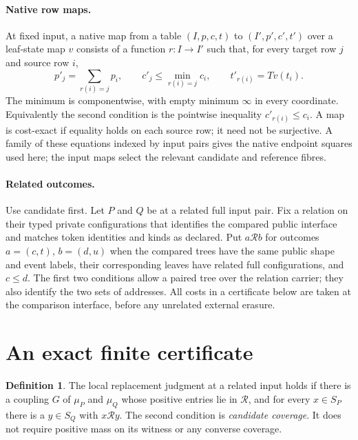 \documentclass[11pt]{article}
\theoremstyle{definition}
\newtheorem{definition}[theorem]{Definition}
\newcommand{\R}{\mathcal R}
\begin{document}
\paragraph{Native row maps.}
At fixed input, a native map from a table $(I,p,c,t)$ to
$(I',p',c',t')$ over a leaf-state map $v$ consists of a function $r:I\to I'$
such that, for every target row $j$ and source row $i$,
\[
 p'_j=\sum_{r(i)=j}p_i,\qquad
 c'_j\leq\min_{r(i)=j}c_i,\qquad
 t'_{r(i)}=Tv(t_i).
 \tag{1}\label{eq:native}
\]
The minimum is componentwise, with empty minimum $\infty$ in every
coordinate. Equivalently the second condition is the pointwise
inequality $c'_{r(i)}\leq c_i$. A map is cost-exact if equality holds
on each source row; it need not be surjective. A family of these
equations indexed by input pairs gives the native endpoint squares
used here; the input maps select the relevant candidate and reference
fibres.

\paragraph{Related outcomes.}
Use candidate first. Let $P$ and $Q$ be at a related full input pair.
Fix a relation on their typed private configurations that identifies
the compared public interface and matches token identities and kinds
as declared. Put $a\R b$ for outcomes $a=(c,t)$, $b=(d,u)$ when the
compared trees have the same public shape and event labels, their
corresponding leaves have related full configurations, and $c\leq d$.
The first two conditions allow a paired tree over the relation carrier;
they also identify the two sets of addresses. All costs in a certificate
below are taken at the comparison interface, before any unrelated
external erasure.

\section{An exact finite certificate}

\begin{definition}
The local replacement judgment at a related input holds if there is a
coupling $G$ of $\mu_P$ and $\mu_Q$ whose positive entries lie in $\R$,
and for every $x\in S_P$ there is a $y\in S_Q$ with $x\R y$.
The second condition is \emph{candidate coverage}. It does not require
positive mass on its witness or any converse coverage.
\end{definition}
\end{document}
